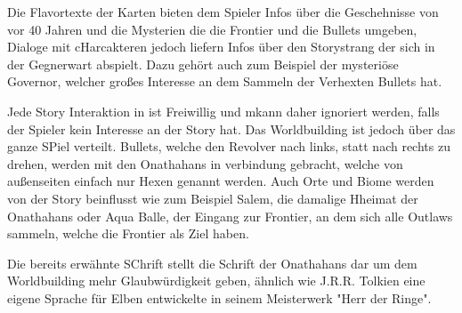 Die Flavortexte der Karten bieten dem Spieler Infos über die Geschehnisse von vor 40 Jahren und die Mysterien die die
Frontier und die Bullets umgeben, Dialoge mit cHarcakteren jedoch liefern Infos über den Storystrang der sich in der Gegnerwart abspielt.
Dazu gehört auch zum Beispiel der mysteriöse Governor, welcher großes Interesse an dem Sammeln der Verhexten Bullets hat.


Jede Story Interaktion in \FF ist Freiwillig und mkann daher ignoriert werden, falls der Spieler kein Interesse an der Story hat.
Das Worldbuilding ist jedoch über das ganze SPiel verteilt. Bullets, welche den Revolver nach links, statt nach rechts zu drehen,
werden mit den Onathahans in verbindung gebracht, welche von außenseiten einfach nur Hexen genannt werden.
Auch Orte und Biome werden von der Story beinflusst wie zum Beispiel Salem, die damalige Hheimat der Onathahans oder Aqua Balle,
der Eingang zur Frontier, an dem sich alle Outlaws sammeln, welche die Frontier als Ziel haben.


Die bereits erwähnte SChrift stellt die Schrift der Onathahans dar um dem Worldbuilding mehr Glaubwürdigkeit geben,
ähnlich wie J.R.R. Tolkien eine eigene Sprache für Elben entwickelte in seinem Meisterwerk "Herr der Ringe". \cite{elbenSprache}

\renewcommand{\kapitelautor}{}

